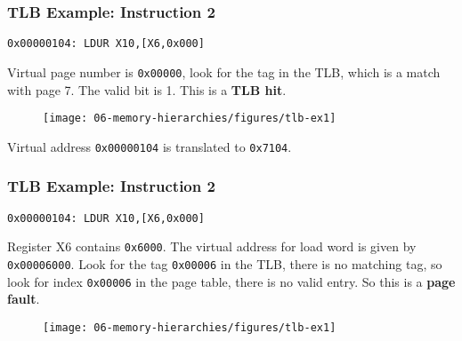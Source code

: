 {%
\begin{frame}[fragile]\frametitle{TLB Example: Instruction 2}
\begin{verbatim}
0x00000104: LDUR X10,[X6,0x000]
\end{verbatim}
Virtual page number is \texttt{0x00000}, look for the tag in the TLB, which is a match with page 7. The valid bit is 1. This is a \textbf{TLB hit}.
\begin{figure}[H]
\centering
	{\texttt{[image: 06-memory-hierarchies/figures/tlb-ex1]}}
\end{figure}
Virtual address \texttt{0x00000104} is translated to \texttt{0x7104}.
\end{frame}
\begin{frame}[fragile]\frametitle{TLB Example: Instruction 2}
\begin{verbatim}
0x00000104: LDUR X10,[X6,0x000]
\end{verbatim}
Register X6 contains \texttt{0x6000}. The virtual address for load word is given by \texttt{0x00006000}. Look for the tag \texttt{0x00006} in the TLB, there is no matching tag, so look for index \texttt{0x00006} in the page table, there is no valid entry. So this is a \textbf{page fault}. 
\begin{figure}[H]
\centering
	{\texttt{[image: 06-memory-hierarchies/figures/tlb-ex1]}}
\end{figure}


\end{frame}}
